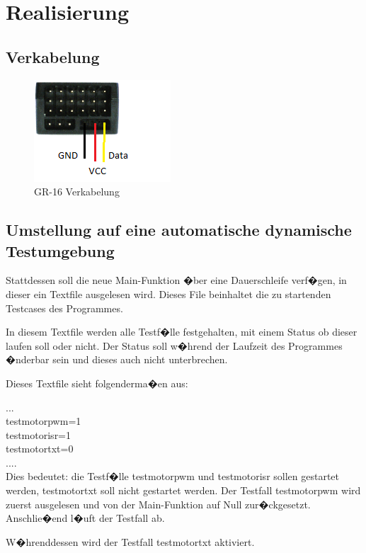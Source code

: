 ﻿\chapter{Realisierung}
\label{sec:real}

\section{Verkabelung}

\begin{figure}[H]
	\centering
	\includegraphics{fig_motor/GR-16.png}
	\caption[GR-16 Verkabelung]{GR-16 Verkabelung\protect\footnotemark}
\end{figure}

\newpage
\section{Umstellung auf eine automatische dynamische Testumgebung}


Stattdessen soll die neue Main-Funktion �ber eine Dauerschleife verf�gen, in dieser ein Textfile ausgelesen wird. Dieses File beinhaltet die zu startenden Testcases des Programmes.

In diesem Textfile werden alle Testf�lle festgehalten, mit einem Status ob dieser laufen soll oder nicht. Der Status soll w�hrend der Laufzeit des Programmes �nderbar sein und dieses auch nicht unterbrechen.

Dieses Textfile sieht folgenderma�en aus:

...\\
testmotorpwm=1\\
testmotorisr=1\\
testmotortxt=0\\
....\\

Dies bedeutet: die Testf�lle testmotorpwm und testmotorisr sollen gestartet werden, testmotortxt soll nicht gestartet werden.
Der Testfall testmotorpwm wird zuerst ausgelesen und von der Main-Funktion auf Null zur�ckgesetzt. Anschlie�end l�uft der Testfall ab.

W�hrenddessen wird der Testfall testmotortxt aktiviert. 

